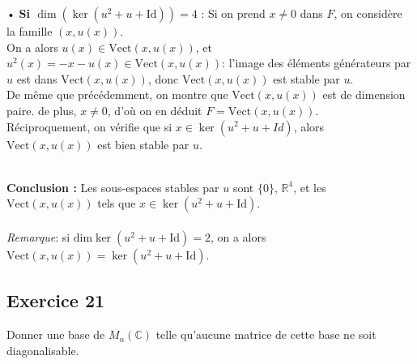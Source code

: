 \documentclass[a4paper,12pt]{article}
\begin{document}
\begin{correctionbox}
\begin{itemize}
                • \textbf{Si \( \dim(\ker(u^2 + u + \mathrm{Id})) = 4 \)} : Si on prend $x \not = 0$ dans $F$, on considère la famille $(x, u(x))$. \\
                On a alors $u(x) \in \mathrm{Vect}(x, u(x))$, et $u^2(x) = -x-u(x) \in \mathrm{Vect}(x, u(x))$: l'image des éléments générateurs par $u$ est dans $\mathrm{Vect}(x, u(x))$, donc $\mathrm{Vect}(x, u(x))$ est stable par $u$. \\
                De même que précédemment, on montre que $\mathrm{Vect}(x, u(x))$ est de dimension paire. de plus, $x \not = 0$, d'où on en déduit $F = \mathrm{Vect}(x, u(x))$. \\
                Réciproquement, on vérifie que si $x \in \ker (u^2 + u + Id)$, alors $\mathrm{Vect}(x, u(x))$ est bien stable par $u$.
                \\\\
        \end{itemize}
        \textbf{Conclusion :} Les sous-espaces stables par \( u \) sont \( \{0\} \), \( \mathbb{R}^4 \), et les $\mathrm{Vect}(x, u(x))$ tels que \( x \in\ker(u^2 + u + \mathrm{Id}) \).\\\\
        \textit{Remarque}: si $\mathrm{dim} \ker (u^2 + u + \mathrm{Id}) = 2$, on a alors $\mathrm{Vect}(x, u(x)) = \ker (u^2 + u + \mathrm{Id})$.
    \end{correctionbox}



    \subsection*{Exercice 21}
    Donner une base de \( M_n(\mathbb{C}) \) telle qu'aucune matrice de cette base ne soit diagonalisable.
    
\end{document}
